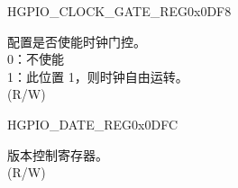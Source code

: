 \begin{register}{H}{GPIO\_CLOCK\_GATE\_REG}{0x0DF8}\label{regdesc:GPIOCLOCKGATEREG}
%
%
\regnewline%
\begin{regdesc}\begin{reglist}
\label{fielddesc:GPIOCLKEN}\item [GPIO\_CLK\_EN] 配置是否使能时钟门控。\\
0：不使能\\
1：此位置 1，则时钟自由运转。 \\ (R/W)
\end{reglist}\end{regdesc}
\end{register}


\begin{register}{H}{GPIO\_DATE\_REG}{0x0DFC}\label{regdesc:GPIODATEREG}
%
%
\regnewline%
\begin{regdesc}\begin{reglist}
\label{fielddesc:GPIODATE}\item [GPIO\_DATE] 版本控制寄存器。 \\ (R/W)
\end{reglist}\end{regdesc}
\end{register}


